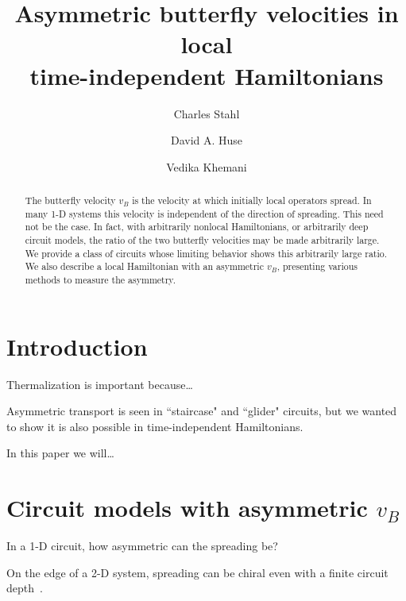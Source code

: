 \documentclass[aps,prl,reprint,superscriptaddress, longbibliography]{revtex4-1}
\begin{document}
\title{Asymmetric butterfly velocities in local\\ time-independent Hamiltonians
} 

\author{Charles Stahl}
\author{David A. Huse}
\author{Vedika Khemani}

\begin{abstract}
The butterfly velocity $v_B$ is the velocity at which initially local operators spread. In many 1-D systems this velocity is independent of the direction of spreading. This need not be the case. In fact, with arbitrarily nonlocal Hamiltonians, or arbitrarily deep circuit models, the ratio of the two butterfly velocities may be made arbitrarily large. We provide a class of circuits whose limiting behavior shows this arbitrarily large ratio. We also describe a local Hamiltonian with an asymmetric $v_B$, presenting various methods to measure the asymmetry.
\end{abstract}

\maketitle

\section{Introduction}

Thermalization is important because\dots

Asymmetric transport is seen in ``staircase" and ``glider" circuits, but we wanted to show it is also possible in time-independent Hamiltonians. 

In this paper we will\dots

\pagebreak

\section{Circuit models with asymmetric $v_B$} \label{sec:circ}

In a 1-D circuit, how asymmetric can the spreading be?

On the edge of a 2-D system, spreading can be chiral even with a finite circuit depth~\cite{PoChiralCircuit}.
\end{document}
